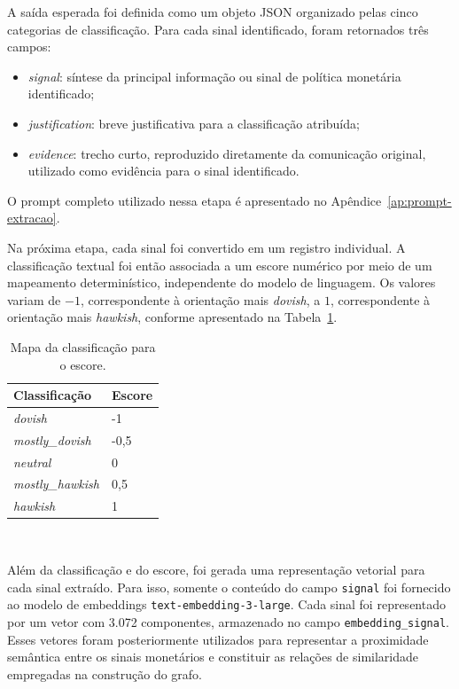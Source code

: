 A saída esperada foi definida como um objeto JSON organizado pelas 
cinco categorias de classificação. Para cada sinal identificado, 
foram retornados três campos:

\begin{itemize}
\item \textit{signal}: síntese da principal informação ou sinal de 
política monetária identificado;
\item \textit{justification}: breve justificativa para a 
classificação atribuída;
\item \textit{evidence}: trecho curto, reproduzido diretamente da 
comunicação original, utilizado como evidência para o sinal identificado.
\end{itemize}

O prompt completo utilizado nessa etapa é apresentado no 
Apêndice~\ref{ap:prompt-extracao}.


Na próxima etapa, cada sinal foi convertido em um registro individual. 
A classificação textual foi então associada a um escore numérico por 
meio de um mapeamento determinístico, independente do modelo de linguagem. 
Os valores variam de $-1$, correspondente à orientação mais \textit{dovish}, 
a $1$, correspondente à orientação mais \textit{hawkish}, conforme apresentado na
Tabela~\ref{tab:score-sinais}.

\begin{table}[htb]
\centering
\caption{Mapa da classificação para o escore.}
\label{tab:score-sinais}
\begin{tabular}{p{} p{}}
\hline
\textbf{Classificação} & \textbf{Escore} \\
\hline
\textit{dovish} & -1 \\
\textit{mostly\_dovish} & -0,5 \\
\textit{neutral} & 0 \\
\textit{mostly\_hawkish} & 0,5 \\
\textit{hawkish} & 1 \\
\hline
\end{tabular}
\\
\end{table}

Além da classificação e do escore, foi gerada uma representação vetorial 
para cada sinal extraído. Para isso, somente o conteúdo do campo 
\texttt{signal} foi fornecido ao modelo de embeddings \texttt{text-embedding-3-large}. 
Cada sinal foi representado por um vetor com 3.072 componentes, 
armazenado no campo \texttt{embedding\_signal}. Esses vetores foram posteriormente 
utilizados para representar a proximidade semântica entre os sinais 
monetários e constituir as relações de similaridade empregadas na construção do grafo.

